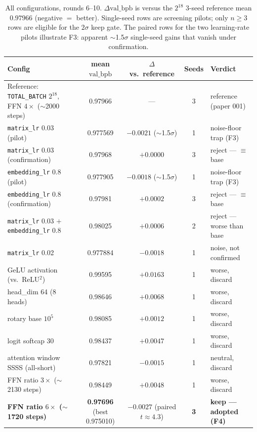 \documentclass{article}
\newcommand{\valbpb}{\mathrm{val\_bpb}}
\begin{document}
\begin{table}[t]
\caption{All configurations, rounds 6--10. $\Delta\valbpb$ is versus the $2^{18}$ 3-seed reference mean $0.97966$ (negative $=$ better). Single-seed rows are screening pilots; only $n \geq 3$ rows are eligible for the $2\sigma$ keep gate. The paired rows for the two learning-rate pilots illustrate F3: apparent $\sim$1.5$\sigma$ single-seed gains that vanish under confirmation.}
\label{tab:results}
\vskip 0.15in
\begin{center}
\begin{small}
\begin{tabular}{lcccl}
\toprule
Config & mean $\valbpb$ & $\Delta$ vs.\ reference & Seeds & Verdict \\
\midrule
Reference: \texttt{TOTAL\_BATCH} $2^{18}$, FFN $4\times$ ($\sim$2000 steps) & 0.97966 & --- & 3 & reference (paper 001) \\
\midrule
\texttt{matrix\_lr} 0.03 (pilot) & 0.977569 & $-0.0021$ ($\sim$1.5$\sigma$) & 1 & noise-floor trap (F3) \\
\texttt{matrix\_lr} 0.03 (confirmation) & 0.97968 & $+0.0000$ & 3 & reject --- $\equiv$ base \\
\texttt{embedding\_lr} 0.8 (pilot) & 0.977905 & $-0.0018$ ($\sim$1.5$\sigma$) & 1 & noise-floor trap (F3) \\
\texttt{embedding\_lr} 0.8 (confirmation) & 0.97981 & $+0.0002$ & 3 & reject --- $\equiv$ base \\
\texttt{matrix\_lr} 0.03 $+$ \texttt{embedding\_lr} 0.8 & 0.98025 & $+0.0006$ & 2 & reject --- worse than base \\
\texttt{matrix\_lr} 0.02 & 0.977884 & $-0.0018$ & 1 & noise, not confirmed \\
\midrule
GeLU activation (vs.\ ReLU$^2$) & 0.99595 & $+0.0163$ & 1 & worse, discard \\
head\_dim 64 (8 heads) & 0.98646 & $+0.0068$ & 1 & worse, discard \\
rotary base $10^5$ & 0.98085 & $+0.0012$ & 1 & worse, discard \\
logit softcap 30 & 0.98437 & $+0.0047$ & 1 & worse, discard \\
attention window SSSS (all-short) & 0.97821 & $-0.0015$ & 1 & neutral, discard \\
FFN ratio $3\times$ ($\sim$2130 steps) & 0.98449 & $+0.0048$ & 1 & worse, discard \\
\midrule
\textbf{FFN ratio $6\times$ ($\sim$1720 steps)} & \textbf{0.97696} (best 0.975010) & $-0.0027$ (paired $t \approx 4.3$) & \textbf{3} & \textbf{keep --- adopted (F4)} \\

\end{tabular}
\end{small}
\end{center}
\end{table}
\end{document}
